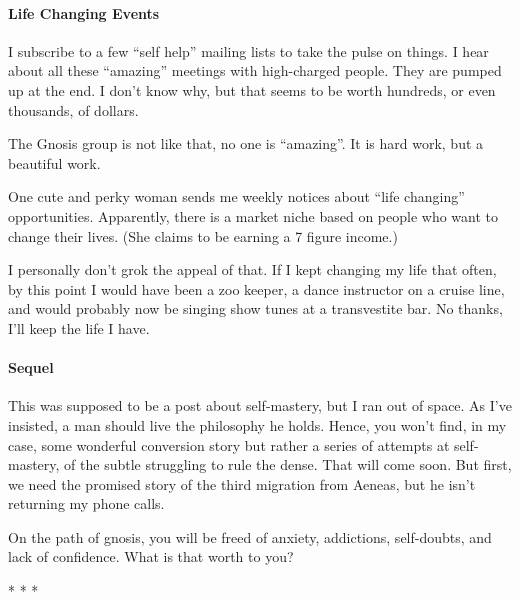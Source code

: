 \paragraph{Life Changing Events}


I subscribe to a few ``self help'' mailing lists to take the pulse on things. I hear about all these ``amazing'' meetings with high-charged people. They are pumped up at the end. I don't know why, but that seems to be worth hundreds, or even thousands, of dollars.

The Gnosis group is not like that, no one is ``amazing''. It is hard work, but a beautiful work.

One cute and perky woman sends me weekly notices about ``life changing'' opportunities. Apparently, there is a market niche based on people who want to change their lives. (She claims to be earning a 7 figure income.)

I personally don't grok the appeal of that. If I kept changing my life that often, by this point I would have been a zoo keeper, a dance instructor on a cruise line, and would probably now be singing show tunes at a transvestite bar. No thanks, I'll keep the life I have.

\paragraph{Sequel}


This was supposed to be a post about self-mastery, but I ran out of space. As I've insisted, a man should live the philosophy he holds. Hence, you won't find, in my case, some wonderful conversion story but rather a series of attempts at self-mastery, of the subtle struggling to rule the dense. That will come soon. But first, we need the promised story of the third migration from Aeneas, but he isn't returning my phone calls.

On the path of gnosis, you will be freed of anxiety, addictions, self-doubts, and lack of confidence. What is that worth to you?



\begin{center}* * *\end{center}

